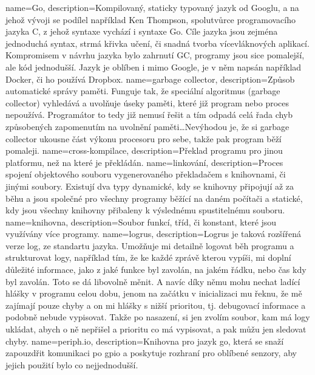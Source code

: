 {
  name={Go},
  description={Kompilovaný, staticky typovaný jazyk od Googlu, a na jehož vývoji se podílel například Ken Thompson, 
    spolutvůrce programovacího jazyka C, z jehož syntaxe vychází i syntaxe Go. Cíle jazyka jsou zejména jednoduchá 
    syntax, strmá křivka učení, či snadná tvorba vícevláknových aplikací. Kompromisem v návrhu jazyka bylo zahrnutí 
    \gls{GC}, programy jsou sice pomalejší, ale kód jednodušší. Jazyk je oblíben i mimo Google, je v něm napsán 
  například Docker, či ho používá Dropbox.}
}
{
  name={garbage collector},
  description={Způsob automatické správy paměti. Funguje tak, že speciální algoritmus (garbage collector) vyhledává 
    a uvolňuje úseky paměti, které již program nebo proces nepoužívá. Programátor to tedy již nemusí řešit a tím odpadá 
    celá řada chyb způsobených zapomenutím na uvolnění paměti\ldots Nevýhodou je, že si garbage collector ukousne část 
    výkonu procesoru pro sebe, takže pak program běží pomaleji.}
}
{
  name={cross-kompilace},
  description={Překlad programu pro jinou platformu, než na které je překládán.}
}
{
  name={linkování},
  description={Proces spojení objektového souboru vygenerovaného překladačem s knihovnami, či jinými soubory. Existují 
  dva typy dynamické, kdy se knihovny připojují až za běhu a jsou společné pro všechny programy běžící na daném počítači 
a statické, kdy jsou všechny knihovny přibaleny k výslednému spustitelnému souboru.}
}
{
  name={knihovna},
  description={Soubor funkcí, tříd, či konstant, které jsou využívány více programy.}
}
{
  name={logrus},
  description={Logrus je taková rozšířená verze  log, ze standartu jazyka. Umožňuje mi 
    detailně logovat běh programu a strukturovat logy, například tím, že ke každé zprávě kterou vypíši, mi doplní 
    důležité informace, jako z jaké funkce byl zavolán, na jakém řádku, nebo čas kdy byl zavolán. Toto se dá libovolně 
    měnit. A navíc díky němu mohu nechat ladící hlášky v programu celou dobu, jenom na začátku v inicializaci mu řeknu, 
  že mě zajímají pouze chyby a on mi hlášky s nižší prioritou, tj. debugovací informace a podobně nebude vypisovat. 
Takže po nasazení, si jen zvolím soubor, kam má logy ukládat, abych o ně nepřišel a prioritu co má vypisovat, a pak můžu 
jen sledovat chyby.}
}
{
  name={periph.io},
  description={Knihovna pro jazyk \gls{go}, která se snaží zapouzdřit komunikaci po \acrshort{gpio} a poskytuje rozhraní 
  pro oblíbené senzory, aby jejich použití bylo co nejjednodušší.}
}
